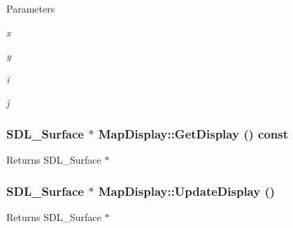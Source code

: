 \begin{DoxyParams}{Parameters}
\item[{\em x}]\item[{\em y}]\item[{\em i}]\item[{\em j}]\end{DoxyParams}
\hypertarget{classMapDisplay_a346dbbf98f1ab76cddab55dfb9c07b27}{
\subsubsection[{GetDisplay}]{\setlength{\rightskip}{0pt plus 5cm}SDL\_\-Surface $\ast$ MapDisplay::GetDisplay () const}}
\label{classMapDisplay_a346dbbf98f1ab76cddab55dfb9c07b27}
\begin{DoxyReturn}{Returns}
SDL\_\-Surface $\ast$ 
\end{DoxyReturn}
\hypertarget{classMapDisplay_a1f8666a47c77fe1294af449e746430dc}{
\subsubsection[{UpdateDisplay}]{\setlength{\rightskip}{0pt plus 5cm}SDL\_\-Surface $\ast$ MapDisplay::UpdateDisplay ()}}
\label{classMapDisplay_a1f8666a47c77fe1294af449e746430dc}
\begin{DoxyReturn}{Returns}
SDL\_\-Surface $\ast$ 
\end{DoxyReturn}


